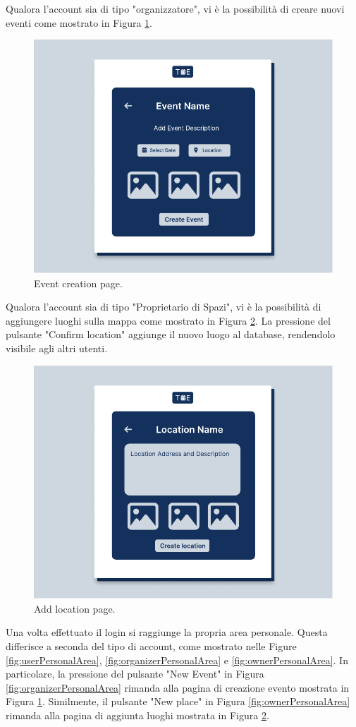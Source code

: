 \documentclass[9pt]{extarticle}
\begin{document}
Qualora l'account sia di tipo "organizzatore", vi è la possibilità di creare nuovi eventi come mostrato in Figura \ref{fig:eventCreation}.
\newpage

\begin{figure}[!htb]
	\centering
	\includegraphics[width=.7\linewidth]{./images/EventCreation.pdf}
	\caption{Event creation page.}
	\label{fig:eventCreation}
\end{figure}

Qualora l'account sia di tipo "Proprietario di Spazi", vi è la possibilità di aggiungere luoghi sulla mappa come mostrato in Figura \ref{fig:addLocation}. La pressione del pulsante "Confirm location" aggiunge il nuovo luogo al database, rendendolo visibile agli altri utenti.

\begin{figure}[!htb]
	\centering
	\includegraphics[width=.7\linewidth]{./images/AddLocation.pdf}
	\caption{Add location page.}
	\label{fig:addLocation}
\end{figure}


Una volta effettuato il login si raggiunge la propria area personale. Questa differisce a seconda del tipo di account, come mostrato nelle Figure \ref{fig:userPersonalArea}, \ref{fig:organizerPersonalArea} e \ref{fig:ownerPersonalArea}. In particolare, la pressione del pulsante "New Event" in Figura \ref{fig:organizerPersonalArea} rimanda alla pagina di creazione evento mostrata in Figura \ref{fig:eventCreation}. Similmente, il pulsante "New place" in Figura \ref{fig:ownerPersonalArea} rimanda alla pagina di aggiunta luoghi mostrata in Figura \ref{fig:addLocation}.
\end{document}
